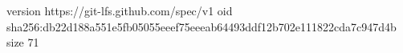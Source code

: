 version https://git-lfs.github.com/spec/v1
oid sha256:db22d188a551e5fb05055eeef75eeeab64493ddf12b702e111822cda7c947d4b
size 71

